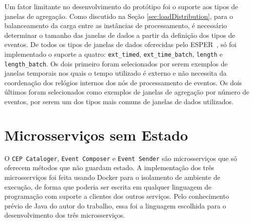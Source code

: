 Um fator limitante no desenvolvimento do protótipo foi o suporte aos tipos de janelas de agregação. Como discutido na Seção \ref{sec:loadDistribution}, para o balanceamento da carga entre as instâncias de processamento, é necessário determinar o tamanho das janelas de dados a partir da definição dos tipos de eventos. De todos os tipos de janelas de dados oferecidas pelo ESPER~\citep{ESPERDataWindows}, só foi implementado o suporte a quatro: \texttt{ext\_timed}, \texttt{ext\_time\_batch}, \texttt{length} e \texttt{length\_batch}. Os dois primeiro foram selecionados por serem exemplos de janelas temporais nos quais o tempo utilizado é externo e não necessita da coordenação dos relógios internos dos nós de processamento de eventos. Os dois últimos foram selecionados como exemplos de janelas de agregação por número de eventos, por serem um dos tipos mais comuns de janelas de dados utilizados. %


\section{Microsserviços sem Estado}
O \texttt{CEP Cataloger}, \texttt{Event Composer} e \texttt{Event Sender} são microsserviços que só oferecem métodos que não guardam estado. A implementação dos três microsserviços foi feita usando Docker para o isolamento de ambiente de execução, de forma que poderia ser escrita em qualquer linguagem de programação com suporte a clientes dos outros serviços. Pelo conhecimento prévio de Java do autor do trabalho, essa foi a linguagem escolhida para o desenvolvimento dos três microsserviços.



